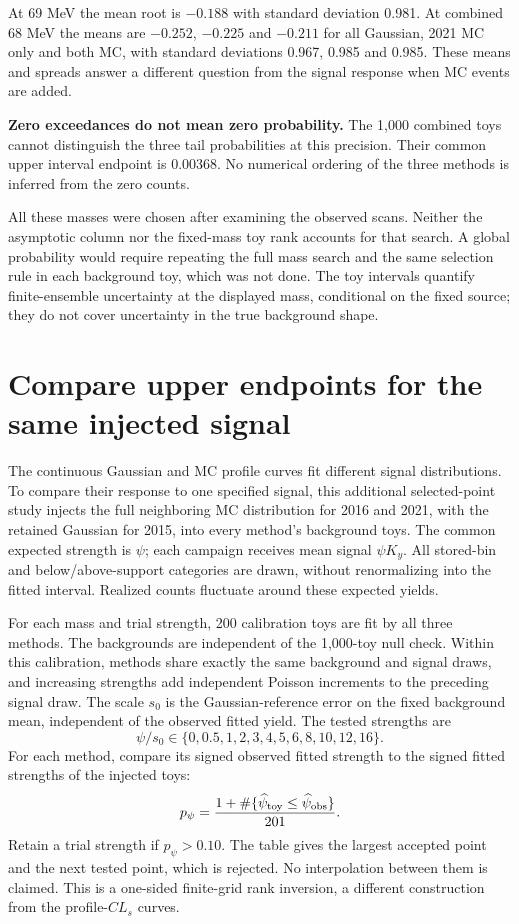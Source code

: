 \documentclass[11pt]{article}
\begin{document}
At 69 MeV the mean root is $-0.188$ with standard deviation 0.981. At combined 68 MeV the means are $-0.252$, $-0.225$ and $-0.211$ for all Gaussian, 2021 MC only and both MC, with standard deviations 0.967, 0.985 and 0.985. These means and spreads answer a different question from the signal response when MC events are added.

\textbf{Zero exceedances do not mean zero probability.} The 1,000 combined toys cannot distinguish the three tail probabilities at this precision. Their common upper interval endpoint is 0.00368. No numerical ordering of the three methods is inferred from the zero counts.

All these masses were chosen after examining the observed scans. Neither the asymptotic column nor the fixed-mass toy rank accounts for that search. A global probability would require repeating the full mass search and the same selection rule in each background toy, which was not done. The toy intervals quantify finite-ensemble uncertainty at the displayed mass, conditional on the fixed source; they do not cover uncertainty in the true background shape.

\clearpage\section*{Compare upper endpoints for the same injected signal}

The continuous Gaussian and MC profile curves fit different signal distributions. To compare their response to one specified signal, this additional selected-point study injects the full neighboring MC distribution for 2016 and 2021, with the retained Gaussian for 2015, into every method's background toys. The common expected strength is $\psi$; each campaign receives mean signal $\psi K_y$. All stored-bin and below/above-support categories are drawn, without renormalizing into the fitted interval. Realized counts fluctuate around these expected yields.

For each mass and trial strength, 200 calibration toys are fit by all three methods. The backgrounds are independent of the 1,000-toy null check. Within this calibration, methods share exactly the same background and signal draws, and increasing strengths add independent Poisson increments to the preceding signal draw. The scale $s_0$ is the Gaussian-reference error on the fixed background mean, independent of the observed fitted yield. The tested strengths are
\[
 \psi/s_0\in\{0,0.5,1,2,3,4,5,6,8,10,12,16\}.
\]
For each method, compare its signed observed fitted strength to the signed fitted strengths of the injected toys:
\[
 p_\psi=\frac{1+\#\{\widehat\psi_{\rm toy}\le\widehat\psi_{\rm obs}\}}{201}.
\]
Retain a trial strength if $p_\psi>0.10$. The table gives the largest accepted point and the next tested point, which is rejected. No interpolation between them is claimed. This is a one-sided finite-grid rank inversion, a different construction from the profile-$CL_s$ curves.
\end{document}
